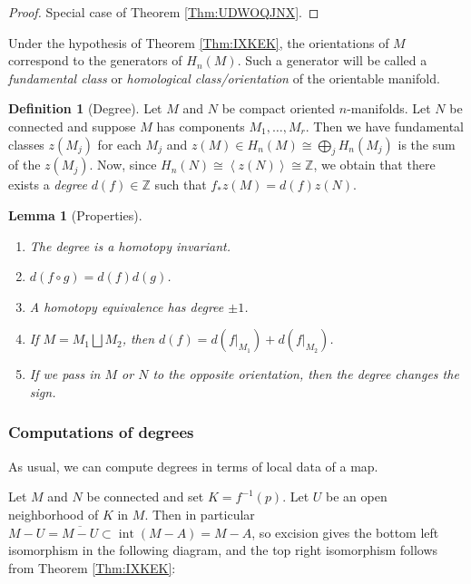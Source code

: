 \documentclass[reqno]{amsart}
\newtheorem{lemma}[theorem]{Lemma}
\theoremstyle{definition}
\newtheorem{definition}[theorem]{Definition}
\theoremstyle{remark}
\DeclareMathOperator{\Int}{int}
\begin{document}
\begin{proof}
    Special case of Theorem \ref{Thm:UDWOQJNX}.
\end{proof}

Under the hypothesis of Theorem \ref{Thm:IXKEK}, 
the orientations of $M$ correspond to the generators
of $H_n(M)$. Such a generator will be called
a \textit{fundamental class} or \textit{homological class/orientation}
of the orientable manifold.

\begin{definition}[Degree]
    Let $M$ and $N$ be compact oriented $n$-manifolds.
    Let $N$ be connected and suppose
    $M$ has components $M_1, \ldots, M_r$. Then
    we have fundamental classes $z(M_j)$ for each
    $M_j$ and $z(M) \in H_n(M) \cong
    \bigoplus_{j} H_n(M_j)$ is the sum of
    the $z(M_j)$.
    Now, since $H_n(N) \cong \left< z(N) \right> \cong
    \mathbb{Z}$, we
    obtain that there exists a \textit{degree}
    $d(f) \in \mathbb{Z}$ such that
    $f_* z(M) = d(f) z(N)$.
\end{definition}

\begin{lemma}[Properties]
    \begin{enumerate}
        \item The degree is a homotopy invariant.
        \item $d(f \circ g) = d(f) d(g)$.
        \item A homotopy equivalence has degree
            $\pm 1$.
        \item If $M = M_1 \bigsqcup M_2$, then
            $d(f) = d\left( f|_{M_1} \right) +
            d\left( f|_{M_2} \right) $.
        \item If we pass in $M$ or $N$ to the opposite orientation,
            then the degree changes the sign.
    \end{enumerate}
\end{lemma}

\subsubsection{Computations of degrees}

As usual, we can compute degrees in terms of local data of a map.

Let $M$ and $N$ be connected and set
$K = f^{-1}(p)$. Let $U$ be an open neighborhood of
$K$ in $M$. Then in particular
$M - U = \overline{M - U} \subset \Int (M - A) = 
M - A$, so excision gives the bottom left isomorphism in
the following diagram, and the top right isomorphism
follows from Theorem \ref{Thm:IXKEK}:
\end{document}
